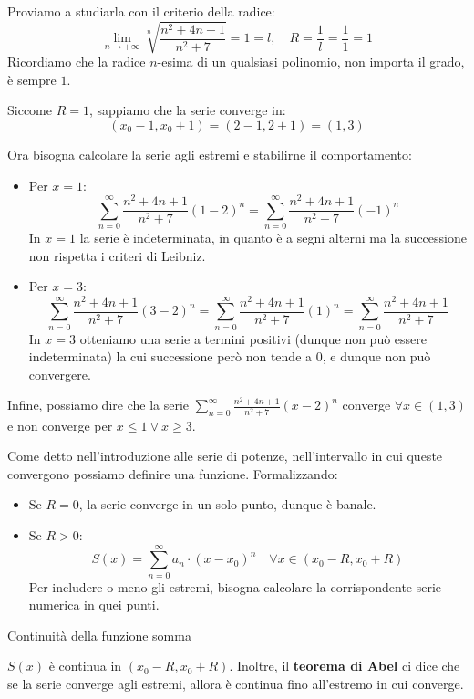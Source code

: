 \documentclass[12pt]{report}
\begin{document}
	Proviamo a studiarla con il criterio della radice:
	\[
	\lim_{n \to +\infty} \sqrt[n]{\frac{n^2+4n+1}{n^2+7}} = 1 = l, \quad R = \frac{1}{l} = \frac{1}{1} = 1
	\]
	Ricordiamo che la radice $n$-esima di un qualsiasi polinomio, non importa il grado, è sempre $1$.
	
	Siccome $R=1$, sappiamo che la serie converge in:
	\[
	(x_0 - 1, x_0 + 1) = (2-1, 2+1) = (1, 3)
	\]
	
	Ora bisogna calcolare la serie agli estremi e stabilirne il comportamento:
	
	\begin{itemize}
		
		\item Per $x = 1$:
		\[
		\sum_{n=0}^{\infty} \frac{n^2+4n+1}{n^2+7} (1-2)^n = \sum_{n=0}^{\infty} \frac{n^2+4n+1}{n^2+7} (-1)^n
		\]
		In $x = 1$ la serie è indeterminata, in quanto è a segni alterni ma la successione non rispetta i criteri di Leibniz.
		
		\item Per $x = 3$:
		\[
		\sum_{n=0}^{\infty} \frac{n^2+4n+1}{n^2+7} (3-2)^n = \sum_{n=0}^{\infty} \frac{n^2+4n+1}{n^2+7} (1)^n = \sum_{n=0}^{\infty} \frac{n^2+4n+1}{n^2+7}
		\]
		In $x = 3$ otteniamo una serie a termini positivi (dunque non può essere indeterminata) la cui successione però non tende a $0$, e dunque non può convergere.
		
	\end{itemize}
	
	Infine, possiamo dire che la serie $\sum_{n=0}^{\infty} \frac{n^2+4n+1}{n^2+7} (x-2)^n$ converge $\forall x \in (1, 3)$ e non converge per $x \le 1 \lor x \ge 3$.
	
	Come detto nell'introduzione alle serie di potenze, nell'intervallo in cui queste convergono possiamo definire una funzione.
	Formalizzando:
	\begin{itemize}
		
		\item Se $R = 0$, la serie converge in un solo punto, dunque è banale.
		
		\item Se $R > 0$:
		\[
		S(x) = \sum_{n=0}^{\infty} a_n \cdot (x - x_0)^n \quad \forall x \in (x_0 - R, x_0 + R)
		\]
		Per includere o meno gli estremi, bisogna calcolare la corrispondente serie numerica in quei punti.
		
	\end{itemize}
	
	\begin{teorema}{Continuità della funzione somma}{}
		
		$S(x)$ è continua in $(x_0 - R, x_0 + R)$.
		Inoltre, il \textbf{teorema di Abel} ci dice che se la serie converge agli estremi, allora è continua fino all'estremo in cui converge.
		
	\end{teorema}
	
\end{document}
